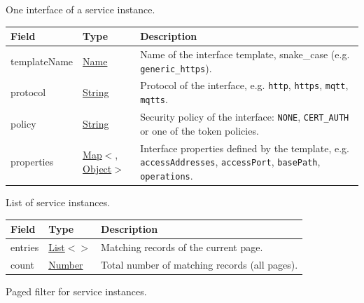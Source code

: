 \documentclass[a4paper]{arrowhead}
\newcommand{\mref}[2][]{{\textcolor{ArrowheadPurple}{\hyperref[sec:model:#2]{\ifstrempty{#1}{#2}{#1}}}}}
\newcommand{\pref}[1]{{\textcolor{ArrowheadGrey}{\hyperref[sec:model:primitives:#1]{#1}}}}
\begin{document}

One interface of a service instance.


\noindent\begin{tabularx}{\textwidth}{| >{\raggedright\arraybackslash}p{3.9cm} | >{\raggedright\arraybackslash\small}p{5.3cm} | X |} \hline
\rowcolor{gray!33} Field & Type & Description \\ \hline
template\allowbreak{}Name & \pref{Name} & Name of the interface template, snake\_case (e.g. \texttt{generic\_\allowbreak{}https}). \\ \hline
protocol & \pref{String} & Protocol of the interface, e.g. \texttt{http}, \texttt{https}, \texttt{mqtt}, \texttt{mqtts}. \\ \hline
policy & \pref{String} & Security policy of the interface: \texttt{NONE}, \texttt{CERT\_\allowbreak{}AUTH} or one of the token policies. \\ \hline
properties & \pref{Map}$<$\allowbreak{}\pref{String}, \pref{Object}$>$ & Interface properties defined by the template, e.g. \texttt{accessAddresses}, \texttt{accessPort}, \texttt{basePath}, \texttt{operations}. \\ \hline
\end{tabularx}




List of service instances.


\noindent\begin{tabularx}{\textwidth}{| >{\raggedright\arraybackslash}p{3.9cm} | >{\raggedright\arraybackslash\small}p{5.3cm} | X |} \hline
\rowcolor{gray!33} Field & Type & Description \\ \hline
entries & \pref{List}$<$\allowbreak{}\mref{ServiceInstanceResponse}$>$ & Matching records of the current page. \\ \hline
count & \pref{Number} & Total number of matching records (all pages). \\ \hline
\end{tabularx}




Paged filter for service instances.
\end{document}
